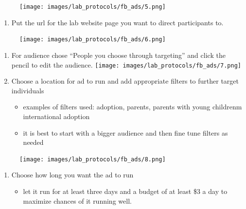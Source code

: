 \documentclass[
]{book}
\providecommand{\tightlist}{%
  \setlength{\itemsep}{0pt}\setlength{\parskip}{0pt}}
\begin{document}
\begin{figure}
\centering
\texttt{[image: images/lab\_protocols/fb\_ads/5.png]}
\caption{}
\end{figure}

\begin{enumerate}
\def\labelenumi{\arabic{enumi}.}
\setcounter{enumi}{5}
\tightlist
\item
  Put the url for the lab website page you want to direct participants to.
\end{enumerate}

\begin{figure}
\centering
\texttt{[image: images/lab\_protocols/fb\_ads/6.png]}
\caption{}
\end{figure}

\begin{enumerate}
\def\labelenumi{\arabic{enumi}.}
\setcounter{enumi}{6}
\item
  For audience chose ``People you choose through targeting'' and click the pencil to edit the audience.
  \texttt{[image: images/lab\_protocols/fb\_ads/7.png]}
\item
  Choose a location for ad to run and add appropriate filters to further target individuals

  \begin{itemize}
  \item
    examples of filters used: adoption, parents, parents with young childrenm international adoption
  \item
    it is best to start with a bigger audience and then fine tune filters as needed
  \end{itemize}
\end{enumerate}

\begin{figure}
\centering
\texttt{[image: images/lab\_protocols/fb\_ads/8.png]}
\caption{}
\end{figure}

\begin{enumerate}
\def\labelenumi{\arabic{enumi}.}
\setcounter{enumi}{8}
\item
  Choose how long you want the ad to run

  \begin{itemize}
  \tightlist
  \item
    let it run for at least three days and a budget of at least \$3 a day to maximize chances of it running well.
  \end{itemize}
\end{enumerate}
\end{document}
